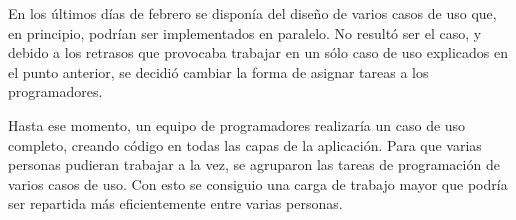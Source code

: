 En los últimos días de febrero se disponía del diseño de varios casos de uso
que, en principio, podrían ser implementados en paralelo. No resultó ser el
caso, y debido a los retrasos que provocaba trabajar en un sólo caso de uso
explicados en el punto anterior, se decidió cambiar la forma de asignar tareas
a los programadores.

Hasta ese momento, un equipo de programadores realizaría un caso de uso
completo, creando código en todas las capas de la aplicación. Para que varias
personas pudieran trabajar a la vez, se agruparon las tareas de programación de
varios casos de uso. Con esto se consiguio una carga de trabajo mayor que
podría ser repartida más eficientemente entre varias personas.
